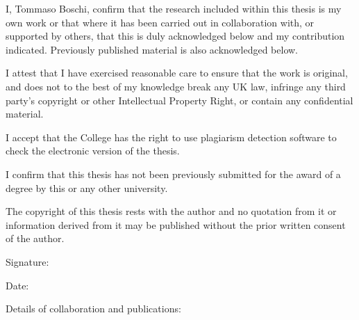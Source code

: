 \clearpage

I, Tommaso Boschi, confirm that the research included within this thesis %
is my own work or that where it has been carried out in collaboration with, %
or supported by others, that this is duly acknowledged below and my contribution indicated.
Previously published material is also acknowledged below.

\medskip
\noindent
I attest that I have exercised reasonable care to ensure that the work is original, %
and does not to the best of my knowledge break any UK law, infringe any third party’s copyright %
or other Intellectual Property Right, or contain any confidential material.

\medskip
\noindent
I accept that the College has the right to use plagiarism detection %
software to check the electronic version of the thesis.

\medskip
\noindent
I confirm that this thesis has not been previously submitted %
for the award of a degree by this or any other university.

\medskip
\noindent
The copyright of this thesis rests with the author and no quotation from it %
or information derived from it may be published without the prior written consent of the author.

\medskip
Signature: 

Date:

\bigskip
Details of collaboration and publications:


